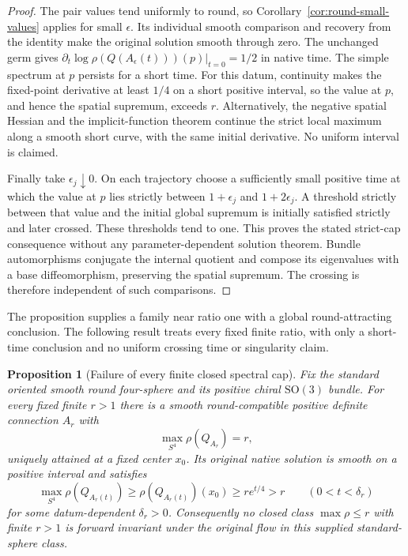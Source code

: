 \documentclass[11pt]{article}
\numberwithin{equation}{section}
\newtheorem{proposition}[theorem]{Proposition}
\theoremstyle{definition}
\theoremstyle{remark}
\begin{document}
\begin{proof}
The pair values tend uniformly to round, so
Corollary~\ref{cor:round-small-values} applies for small
$\epsilon$. Its individual smooth comparison and recovery
from the identity make the original solution smooth through
zero. The unchanged germ gives
$\partial_t\log\rho(Q(A_\epsilon(t)))(p)|_{t=0}=1/2$
in native time. The simple spectrum at $p$ persists for a
short time. For this datum, continuity makes the fixed-point
derivative at least $1/4$ on a short positive
interval, so the value at $p$, and hence the spatial
supremum, exceeds $r$. Alternatively, the negative spatial
Hessian and the implicit-function theorem continue the
strict local maximum along a smooth short curve, with the
same initial derivative. No uniform interval is claimed.

Finally take $\epsilon_j\downarrow0$. On each trajectory
choose a sufficiently small positive time at which the
value at $p$ lies strictly between $1+\epsilon_j$ and
$1+2\epsilon_j$. A threshold strictly between that value
and the initial global supremum is initially satisfied
strictly and later crossed. These thresholds tend to one.
This proves the stated strict-cap consequence without any
parameter-dependent solution theorem. Bundle automorphisms
conjugate the internal quotient and compose its eigenvalues
with a base diffeomorphism, preserving the spatial supremum.
The crossing is therefore independent of such comparisons.
\end{proof}

The proposition supplies a family near ratio one with a
global round-attracting conclusion. The following result
treats every fixed finite ratio, with only a short-time
conclusion and no uniform crossing time or singularity claim.


\begin{proposition}[Failure of every finite closed spectral cap]
\label{prop:fixed-ratio-cap-crossing}
Fix the standard oriented smooth round four-sphere and its
positive chiral $\mathrm{SO}(3)$ bundle. For every fixed finite
$r>1$ there is a smooth round-compatible positive definite
connection $A_r$ with
\[
 \max_{S^4}\rho(Q_{A_r})=r,
\]
uniquely attained at a fixed center $x_0$. Its original native
solution is smooth on a positive interval and satisfies
\[
 \max_{S^4}\rho(Q_{A_r(t)})
       \ge \rho(Q_{A_r(t)})(x_0)\ge r e^{t/4}>r
                       \qquad(0<t<\delta_r)
\]
for some datum-dependent $\delta_r>0$. Consequently no closed
class $\max\rho\le r$ with finite $r>1$ is forward invariant
under the original flow in this supplied standard-sphere class.
\end{proposition}
\end{document}
